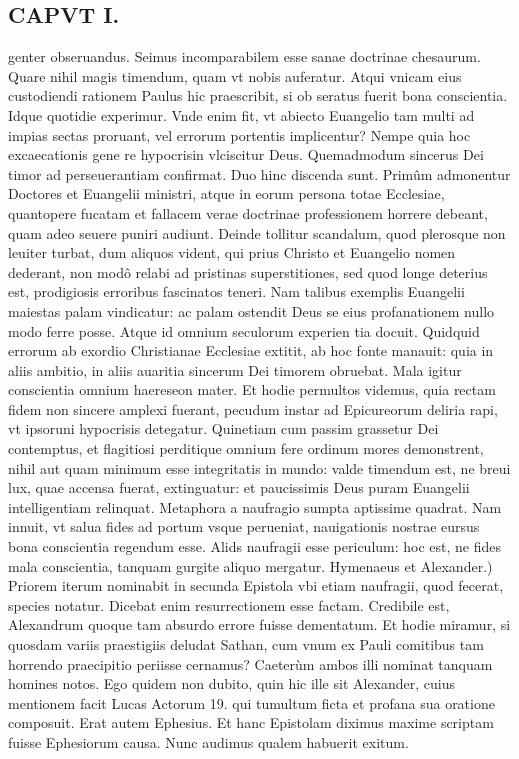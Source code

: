 \documentclass{article}
\begin{document}
\begin{pages}
\section*{CAPVT I. }
\marginpar{[ p.15 ]}\pstart genter obseruandus. Seimus incomparabilem esse sanae doctrinae chesaurum. Quare nihil magis timendum, quam vt nobis auferatur. Atqui vnicam eius custodiendi rationem Paulus hic praescribit, si ob seratus fuerit bona conscientia. Idque quotidie experimur. Vnde enim fit, vt abiecto Euangelio tam multi ad impias sectas proruant, vel errorum portentis implicentur? Nempe quia hoc excaecationis gene re hypocrisin vlciscitur Deus. Quemadmodum sincerus Dei timor ad perseuerantiam confirmat. Duo hinc discenda sunt. Primûm admonentur Doctores et Euangelii ministri, atque in eorum persona totae Ecclesiae, quantopere fucatam et fallacem verae doctrinae professionem horrere debeant, quam adeo seuere puniri audiunt. Deinde tollitur scandalum, quod plerosque non leuiter turbat, dum aliquos vident, qui prius Christo et Euangelio nomen dederant, non modô relabi ad pristinas superstitiones, sed quod longe deterius est, prodigiosis erroribus fascinatos teneri. Nam talibus exemplis Euangelii maiestas palam vindicatur: ac palam ostendit Deus se eius profanationem nullo modo ferre posse. Atque id omnium seculorum experien tia docuit. Quidquid errorum ab exordio Christianae Ecclesiae extitit, ab hoc fonte manauit: quia in aliis ambitio, in aliis auaritia sincerum Dei timorem obruebat. Mala igitur conscientia omnium haereseon mater. Et hodie permultos videmus, quia rectam fidem non sincere amplexi fuerant, pecudum instar ad Epicureorum deliria rapi, vt ipsoruni hypocrisis detegatur. Quinetiam cum passim grassetur Dei contemptus, et flagitiosi perditique omnium fere ordinum mores demonstrent, nihil aut quam minimum esse integritatis in mundo: valde timendum est, ne breui lux, quae accensa fuerat, extinguatur: et paucissimis Deus puram Euangelii intelligentiam relinquat. Metaphora a naufragio sumpta aptissime quadrat. Nam innuit, vt salua fides ad portum vsque perueniat, nauigationis nostrae eursus bona conscientia regendum esse. Alids naufragii esse periculum: hoc est, ne fides mala conscientia, tanquam gurgite aliquo mergatur.  \pend\pstart Hymenaeus et Alexander.) Priorem iterum nominabit in secunda Epistola vbi etiam naufragii, quod fecerat, species notatur. Dicebat enim resurrectionem esse factam. Credibile est, Alexandrum quoque tam absurdo errore fuisse dementatum. Et hodie miramur, si quosdam variis praestigiis deludat Sathan, cum vnum ex Pauli comitibus tam horrendo praecipitio periisse cernamus? Caeterùm ambos illi nominat tanquam homines notos. Ego quidem non dubito, quin hic ille sit Alexander, cuius mentionem facit Lucas Actorum 19. qui tumultum ficta et profana sua oratione composuit. Erat autem Ephesius. Et hanc Epistolam diximus maxime scriptam fuisse Ephesiorum causa. Nunc audimus qualem habuerit exitum.  \pend

\end{pages}
\end{document}
